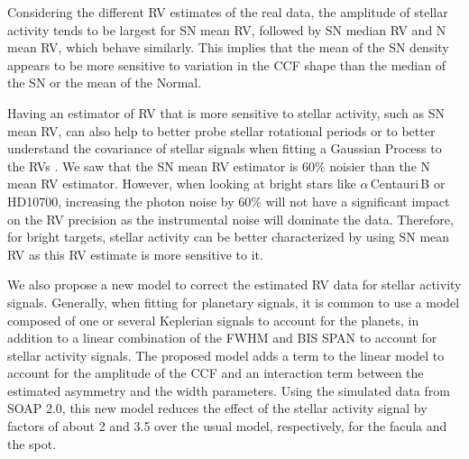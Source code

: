 \documentclass{aa}
\newcommand{\jessi}[1]{{\color{Purple}[[\textbf{Jessi: }#1]]}}
\newcommand{\xavier}[1]{{\color{blue}[[\textbf{Xavier: }#1]]}}
\newcommand{\umberto}[1]{{\color{green}[[\textbf{Umberto: }#1]]}}
\begin{document}
Considering the different RV estimates of the real data, the amplitude of stellar activity tends to be largest for SN mean RV, followed by SN median RV and N mean RV, which behave similarly. 
This implies that the mean of the SN density appears to be more sensitive to variation in the CCF shape than the median of the SN or the mean of the Normal.  

Having an estimator of RV that is more sensitive to stellar activity, such as SN mean RV, can also help to better probe stellar rotational periods or to better understand the covariance of stellar signals when fitting a Gaussian Process to the RVs \citep[e.g.][]{Faria-2016a, Haywood-2014}. 
We saw that the SN mean RV estimator is 60\% noisier than the N mean RV estimator. 
However, when looking at bright
stars like $\alpha$\,Centauri\,B or HD10700, increasing the photon noise by 60\% will not have a significant impact
on the RV precision as the instrumental noise will dominate the data. 
Therefore, for bright targets, stellar activity 
can be better characterized by using SN mean RV as this RV estimate is more sensitive to it.
%


We also propose a new model to correct the estimated RV data for stellar activity signals. 
Generally, when fitting for planetary signals, it is common to use a model composed of one or several Keplerian signals to account for the planets, in addition to a linear combination of the FWHM and BIS SPAN to account for stellar activity signals. 
The proposed model adds a term to the linear model to account for the amplitude of the CCF and an interaction term between the estimated asymmetry and the width parameters. 
Using the simulated data from SOAP 2.0, this new model reduces the effect of the stellar activity signal by factors of about 2 and 3.5 over the usual model, respectively, for the facula and the spot.
\end{document}
